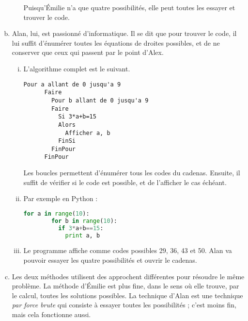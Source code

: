 \documentclass[11pt]{article}
\begin{document}
\begin{question}
\begin{enumerate}[(a)]
\begin{enumerate}[(i)]
        Puisqu'Émilie n'a que quatre possibilités, elle peut toutes les essayer et trouver le code.
      \end{enumerate}
    \item Alan, lui, est passionné d'informatique. Il se dit que pour trouver
      le code, il lui suffit d'énumérer toutes les équations de droites
      possibles, et de ne conserver que ceux qui passent par le point d'Alex.
      \begin{enumerate}[(i)]
        \item L'algorithme complet est le suivant.
      \begin{lstlisting}[language=naturel,frame=lines,mathescape=true]
      Pour a allant de 0 jusqu'a 9
      Faire
        Pour b allant de 0 jusqu'a 9
        Faire
          Si 3*a+b=15
          Alors
            Afficher a, b
          FinSi
        FinPour
      FinPour
      \end{lstlisting}
      Les boucles permettent d'énumérer tous les codes du cadenas. Ensuite, il suffit de vérifier si le code est possible, et de l'afficher le cas échéant.
        \item Par exemple en Python :
      \begin{lstlisting}[language=python,frame=lines,mathescape=true]
      for a in range(10):
        for b in range(10):
          if 3*a+b==15:
            print a, b
      \end{lstlisting}
        \item Le programme affiche comme codes possibles 29, 36, 43 et 50. Alan va pouvoir essayer les quatre possibilités et ouvrir le cadenas.
      \end{enumerate}
    \item Les deux méthodes utilisent des approchent différentes pour résoudre le même problème. La méthode d'Émilie est plus fine, dans le sens où elle trouve, par le calcul, toutes les solutions possibles. La technique d'Alan est une technique \emph{par force brute} qui consiste à essayer toutes les possibilités ; c'est moins fin, mais cela fonctionne aussi.
  \end{enumerate}
\end{question}
\end{document}
